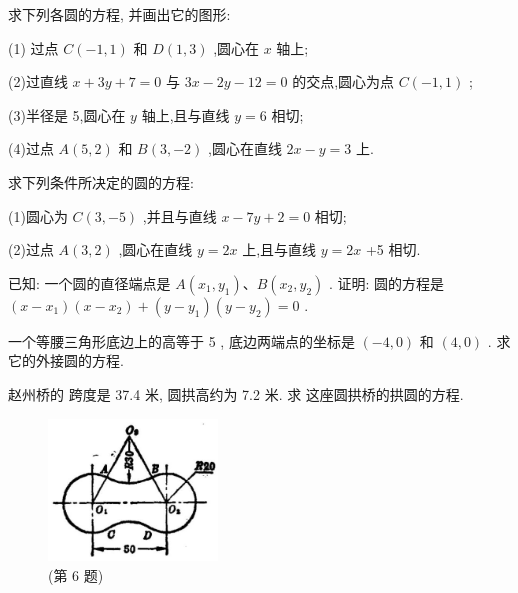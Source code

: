 \documentclass[lang=cn,newtx,10pt,scheme=chinese]{elegantbook}
\begin{document}
\begin{problemset}[习 题 五]

\item 求下列各圆的方程, 并画出它的图形:

(1) 过点 \(C\left( {-1,1}\right)\) 和 \(D\left( {1,3}\right)\) ,圆心在 \(x\) 轴上;

(2)过直线 \(x + {3y} + 7 = 0\) 与 \({3x} - {2y} - {12} = 0\) 的交点,圆心为点 \(C\left( {-1,1}\right)\) ;

(3)半径是 5,圆心在 \(y\) 轴上,且与直线 \(y = 6\) 相切;

(4)过点 \(A\left( {5,2}\right)\) 和 \(B\left( {3, - 2}\right)\) ,圆心在直线 \({2x} - y = 3\) 上.

\item 求下列条件所决定的圆的方程:

(1)圆心为 \(C\left( {3, - 5}\right)\) ,并且与直线 \(x - {7y} + 2 = 0\) 相切;

(2)过点 \(A\left( {3,2}\right)\) ,圆心在直线 \(y = {2x}\) 上,且与直线 \(y = {2x}\) +5 相切.

\item 已知: 一个圆的直径端点是 \(A\left( {{x}_{1},{y}_{1}}\right) \text{、}B\left( {{x}_{2},{y}_{2}}\right)\) . 证明: 圆的方程是 \(\left( {x - {x}_{1}}\right) \left( {x - {x}_{2}}\right) + \left( {y - {y}_{1}}\right) \left( {y - {y}_{2}}\right) = 0\) .

\item 一个等腰三角形底边上的高等于 5 , 底边两端点的坐标是 \(\left( {-4,0}\right)\) 和 \(\left( {4,0}\right)\) . 求它的外接圆的方程.

\item 赵州桥的 跨度是 37.4 米, 圆拱高约为 7.2 米. 求 这座圆拱桥的拱圆的方程.

\begin{figure}[h]
  \centering
  \includegraphics[max width=0.4\textwidth]{images/01912cc2-ffb6-728e-9ae7-b113ff05c64b_85_663180.jpg}
  \caption{(第 6 题)}
\end{figure}




\end{problemset}
\end{document}
